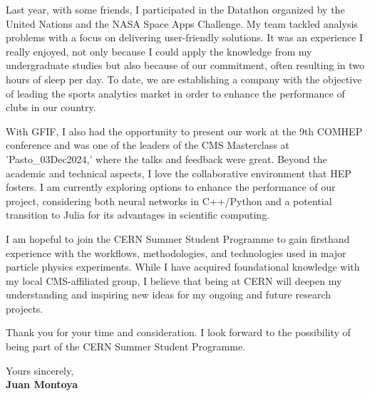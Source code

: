 \documentclass[11pt]{report}
\begin{document}
\begin{titlepage}
\vspace{0.7em}

Last year, with some friends, I participated in the Datathon organized by the United Nations and the NASA Space Apps Challenge. My team tackled analysis problems with a focus on delivering user-friendly solutions. It was an experience I really enjoyed, not only because I could apply the knowledge from my undergraduate studies but also because of our commitment, often resulting in two hours of sleep per day. To date, we are establishing a company with the objective of leading the sports analytics market in order to enhance the performance of clubs in our country.

\vspace{0.7em}

With GFIF, I also had the opportunity to present our work at the 9th COMHEP conference and was one of the leaders of the CMS Masterclass at 'Pasto\_03Dec2024,' where the talks and feedback were great. Beyond the academic and technical aspects, I love the collaborative environment that HEP fosters. I am currently exploring options to enhance the performance of our project, considering both neural networks in C++/Python and a potential transition to Julia for its advantages in scientific computing.

\vspace{0.7em}

I am hopeful to join the CERN Summer Student Programme to gain firsthand experience with the workflows, methodologies, and technologies used in major particle physics experiments. While I have acquired foundational knowledge with my local CMS-affiliated group, I believe that being at CERN will deepen my understanding and inspiring new ideas for my ongoing and future research projects.

\vspace{0.7em}

Thank you for your time and consideration. I look forward to the possibility of being part of the CERN Summer Student Programme.

\vspace{0.7em}


\raggedright Yours sincerely,\\
\textbf{Juan Montoya}

\end{titlepage}
\end{document}
